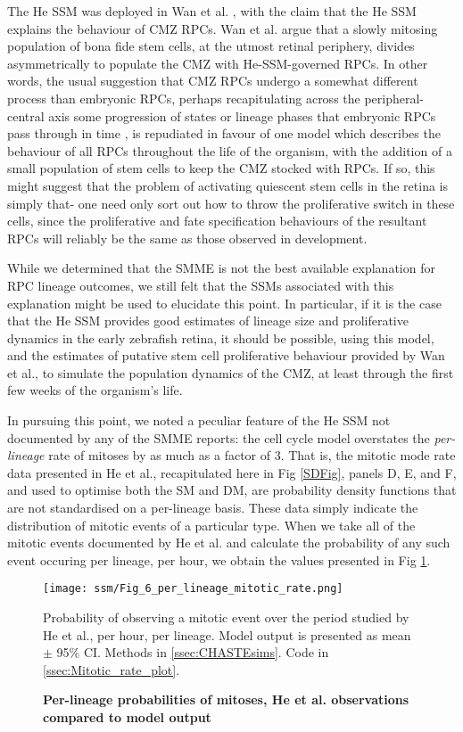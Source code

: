 The He SSM was deployed in Wan et al. \cite{Wan2016}, with the claim that the He SSM explains the behaviour of CMZ RPCs. Wan et al. argue that a slowly mitosing population of bona fide stem cells, at the utmost retinal periphery, divides asymmetrically to populate the CMZ with He-SSM-governed RPCs. In other words, the usual suggestion that CMZ RPCs undergo a somewhat different process than embryonic RPCs, perhaps recapitulating across the peripheral-central axis some progression of states or lineage phases that embryonic RPCs pass through in time \cite{Harris1998}, is repudiated in favour of one model which describes the behaviour of all RPCs throughout the life of the organism, with the addition of a small population of stem cells to keep the CMZ stocked with RPCs. If so, this might suggest that the problem of activating quiescent stem cells in the retina is simply that- one need only sort out how to throw the proliferative switch in these cells, since the proliferative and fate specification behaviours of the resultant RPCs will reliably be the same as those observed in development.

While we determined that the SMME is not the best available explanation for RPC lineage outcomes, we still felt that the SSMs associated with this explanation might be used to elucidate this point. In particular, if it is the case that the He SSM provides good estimates of lineage size and proliferative dynamics in the early zebrafish retina, it should be possible, using this model, and the estimates of putative stem cell proliferative behaviour provided by Wan et al., to simulate the population dynamics of the CMZ, at least through the first few weeks of the organism's life.

In pursuing this point, we noted a peculiar feature of the He SSM not documented by any of the SMME reports: the cell cycle model overstates the  \textit{per-lineage} rate of mitoses by as much as a factor of 3. That is, the mitotic mode rate data presented in He et al., recapitulated here in Fig \ref{SDFig}, panels D, E, and F, and used to optimise both the SM and DM, are probability density functions that are not standardised on a per-lineage basis. These data simply indicate the distribution of mitotic events of a particular type. When we take all of the mitotic events documented by He et al. and calculate the probability of any such event occuring per lineage, per hour, we obtain the values presented in Fig \ref{PerLineageFig}.

\begin{figure}[!h]
\texttt{[image: ssm/Fig\_6\_per\_lineage\_mitotic\_rate.png]}
\caption{{\bf Per-lineage probabilities of mitoses, He et al. observations compared to model output}}
Probability of observing a mitotic event over the period studied by He et al., per hour, per lineage. Model output is presented as mean $\pm$ 95\% CI.
Methods in \autoref{ssec:CHASTEsims}.
Code in \autoref{ssec:Mitotic_rate_plot}.
\label{PerLineageFig}
\end{figure}


